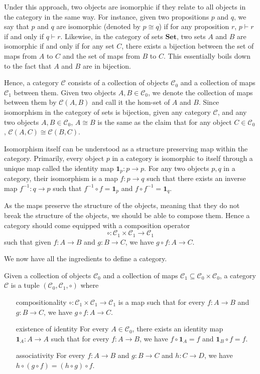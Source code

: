 Under this approach, two objects are isomorphic if they relate to all objects in the category
in the same way. For instance, given two propositions $p$ and $q$, we say that $p$ and $q$
are isomorphic (denoted by $p\cong q$) if for any proposition $r$, $p\vdash r$ if and only if $q\vdash r$.
Likewise, in the category of sets $\mathbf{Set}$, two sets $A$ and $B$ are isomorphic if and only if
for any set $C$, there exists a bijection between the set of maps from $A$ to $C$ and the set of maps from $B$ to $C$.
This essentially boils down to the fact that $A$ and $B$ are in bijection.

Hence, a category $\mathcal{C}$ consists of a collection of objects $\mathcal{C}_0$
and a collection of maps $\mathcal{C}_1$ between them. Given two objects $A,B\in\mathcal{C}_0$,
we denote the collection of maps between them by $\mathcal{C}(A,B)$ and call it the hom-set of $A$ and $B$.
Since isomorphism in the category of sets is bijection, 
given any category $\mathcal{C}$, and any two objects $A,B\in\mathcal{C}_0$,
$A\cong B$ is the same as the claim that for any object $C\in\mathcal{C}_0$,
$\mathcal{C}(A,C)\cong \mathcal{C}(B,C)$.

Isomorphism itself can be understood as a structure preserving map within the category.
Primarily, every object $p$ in a category is isomorphic to itself through a unique
map called the identity map $\mathbf{1}_p:p\to p$.
For any two objects $p,q$ in a category, their isomorphism
is a map $f:p\to q$ such that there exists an inverse map $f^{-1}:q\to p$ such that
$f^{-1}\circ f=\mathbf{1}_p$ and $f\circ f^{-1}=\mathbf{1}_q$.

As the maps preserve the structure of the objects, meaning
that they do not break the structure of the objects,
we should be able to compose them.
Hence a category should come equipped with a composition
operator
\[
    \circ:\mathcal{C}_1\times\mathcal{C}_1\to\mathcal{C}_1
\]
such that given $f:A\to B$ and $g:B\to C$,
we have $g\circ f:A\to C$.

We now have all the ingredients to define a category.

\begin{definition}[Category]
    Given a collection of objects $\mathcal{C}_0$ and a collection of maps $\mathcal{C}_1\subseteq \mathcal{C}_0\times\mathcal{C}_0$,
    a category $\mathcal{C}$ is a tuple $(\mathcal{C}_0,\mathcal{C}_1,\circ)$ where
    \begin{itemize}
        \item[compositionality] $\circ:\mathcal{C}_1\times\mathcal{C}_1\to\mathcal{C}_1$ is a
        map such that for every $f:A\to B$ and $g:B\to C$, we have $g\circ f:A\to C$.
        \item[existence of identity] For every $A\in\mathcal{C}_0$, there exists an identity map $\mathbf{1}_A:A\to A$
        such that for every $f:A\to B$, we have $f\circ \mathbf{1}_A=f$ and $\mathbf{1}_B\circ f=f$.
        \item[associativity] For every $f:A\to B$ and $g:B\to C$ and $h:C\to D$, we have $h\circ (g\circ f)=(h\circ g)\circ f$.
    \end{itemize}
\end{definition}

